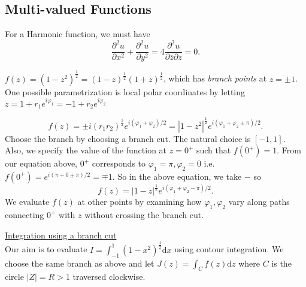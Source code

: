 \documentclass[a4paper]{article}
\begin{document}
\subsection{Multi-valued Functions}

For a Harmonic function, we must have
\[
\frac{\partial^2 u}{\partial x^2}  + \frac{\partial ^2u}{\partial y^2} = 4 \frac{\partial ^2 u }{\partial \overline{z} \partial z}  = 0 
.\] 
\begin{eg}
$f(z) = ( 1- z^2)^{\frac{1}{2}} = ( 1 - z)^{\frac{1}{2}} ( 1 + z)^{\frac{1}{2}}$, which has \emph{branch points} at $z = \pm 1$. One possible parametrization is  local polar coordinates by letting $z = 1 + r_1 e^{ i \varphi_1} = -1 + r_2 e^{ i \varphi_2}$
\begin{center}
\end{center}
\[
f(z) = \pm i ( r_1 r_2)^{\frac{1}{2}} e^{ i ( \varphi_1 + \varphi_2) / 2} = | 1 - z^2|^{\frac{1}{2}} e^{ i ( \varphi_1 + \varphi_2 \pm \pi ) / 2}
.\] 
Choose the branch by choosing a branch cut. The natural choice is $[-1,1]$. Also, we specify the value of the function at  $z = 0^{+}$ such that $f(0^{+}) = 1$. From our equation above, $0^{+} $ corresponds to $\varphi_1 = \pi, \varphi_2 = 0$ i.e. $f(0^{+}) = e^{ i ( \pi + 0 \pm \pi ) / 2} = \mp 1$. So in the above equation, we take $-$ so
\[
    f(z) = |  1- z|^{\frac{1}{2}} e^{ i ( \varphi_1 + \varphi_2 - \pi)  / 2}
.\] 
We evaluate $f(z)$ at other points by examining how  $\varphi_1, \varphi_2$ vary along paths connecting $0^{+}$ with $z$ without crossing the branch cut.
\end{eg}
\underline{Integration using a branch cut} \\
Our aim is to evaluate $I = \int_{-1}^{1} ( 1 - x^2)^{\frac{1}{2}} \text{d}x$ using contour integration. We choose the same branch as above and let $J(z) = \int_C f(z) \text{d}z$ where $C$ is the circle  $|Z| = R > 1$ traversed clockwise.
\end{document}
